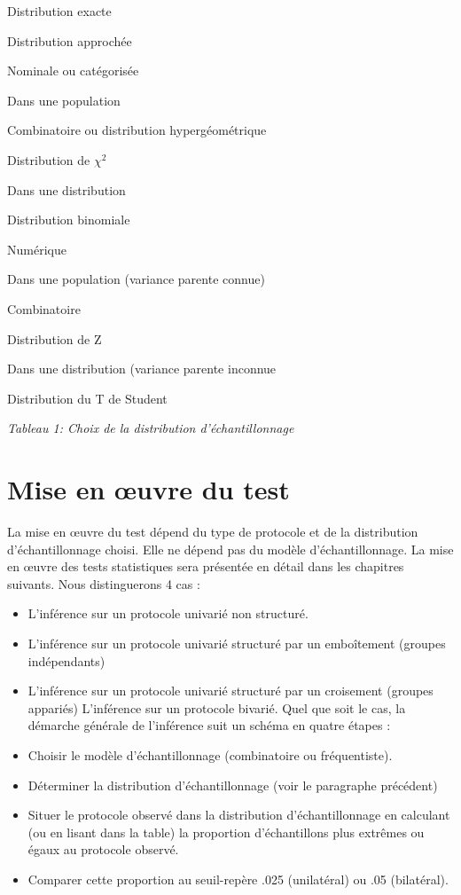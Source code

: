 \documentclass[]{book}
\providecommand{\tightlist}{%
  \setlength{\itemsep}{0pt}\setlength{\parskip}{0pt}}
\theoremstyle{definition}
\theoremstyle{definition}
\theoremstyle{definition}
\theoremstyle{remark}
\begin{document}
Distribution exacte

Distribution approchée

Nominale ou catégorisée

Dans une population

Combinatoire ou distribution hypergéométrique

Distribution de \(\chi^{2}\)

Dans une distribution

Distribution binomiale

Numérique

Dans une population (variance parente connue)

Combinatoire

Distribution de Z

Dans une distribution (variance parente inconnue

Distribution du T de Student

\emph{Tableau 1: Choix de la distribution d'échantillonnage}

\hypertarget{mise-en-uvre-du-test}{%
\section{Mise en œuvre du test}\label{mise-en-uvre-du-test}}

La mise en œuvre du test dépend du type de protocole et de la
distribution d'échantillonnage choisi. Elle ne dépend pas du modèle
d'échantillonnage. La mise en œuvre des tests statistiques sera
présentée en détail dans les chapitres suivants. Nous distinguerons 4
cas :

\begin{itemize}
\tightlist
\item
  L'inférence sur un protocole univarié non structuré.
\item
  L'inférence sur un protocole univarié structuré par un emboîtement
  (groupes indépendants)
\item
  L'inférence sur un protocole univarié structuré par un croisement
  (groupes appariés) L'inférence sur un protocole bivarié. Quel que soit
  le cas, la démarche générale de l'inférence suit un schéma en quatre
  étapes :
\item
  Choisir le modèle d'échantillonnage (combinatoire ou fréquentiste).
\item
  Déterminer la distribution d'échantillonnage (voir le paragraphe
  précédent)
\item
  Situer le protocole observé dans la distribution d'échantillonnage en
  calculant (ou en lisant dans la table) la proportion d'échantillons
  plus extrêmes ou égaux au protocole observé.
\item
  Comparer cette proportion au seuil-repère .025 (unilatéral) ou .05
  (bilatéral).
\end{itemize}
\end{document}
